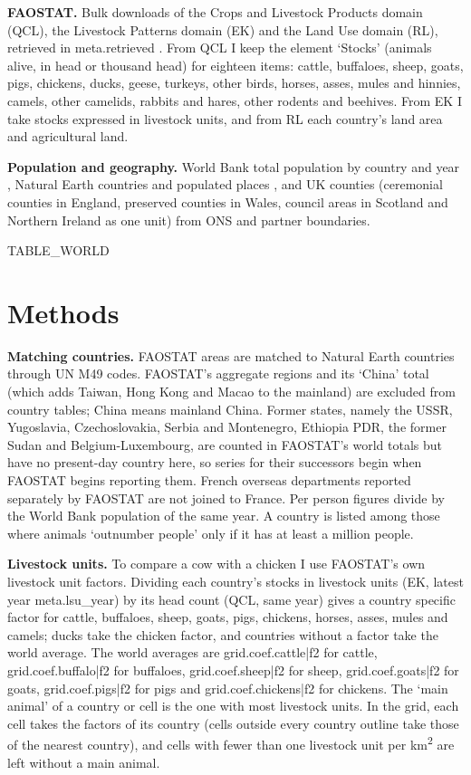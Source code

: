 \documentclass[11pt,a4paper]{article}
\begin{document}
\textbf{FAOSTAT.} Bulk downloads of the Crops and Livestock Products domain (QCL), the Livestock Patterns domain (EK) and the Land Use domain (RL), retrieved in {{meta.retrieved}} \citep{faostat}. From QCL I keep the element `Stocks' (animals alive, in head or thousand head) for eighteen items: cattle, buffaloes, sheep, goats, pigs, chickens, ducks, geese, turkeys, other birds, horses, asses, mules and hinnies, camels, other camelids, rabbits and hares, other rodents and beehives. From EK I take stocks expressed in livestock units, and from RL each country's land area and agricultural land.

\textbf{Population and geography.} World Bank total population by country and year \citep{wbpop}, Natural Earth countries and populated places \citep{naturalearth}, and UK counties (ceremonial counties in England, preserved counties in Wales, council areas in Scotland and Northern Ireland as one unit) from ONS and partner boundaries.

{{TABLE_WORLD}}

\section{Methods}
\textbf{Matching countries.} FAOSTAT areas are matched to Natural Earth countries through UN M49 codes. FAOSTAT's aggregate regions and its `China' total (which adds Taiwan, Hong Kong and Macao to the mainland) are excluded from country tables; China means mainland China. Former states, namely the USSR, Yugoslavia, Czechoslovakia, Serbia and Montenegro, Ethiopia PDR, the former Sudan and Belgium-Luxembourg, are counted in FAOSTAT's world totals but have no present-day country here, so series for their successors begin when FAOSTAT begins reporting them. French overseas departments reported separately by FAOSTAT are not joined to France. Per person figures divide by the World Bank population of the same year. A country is listed among those where animals `outnumber people' only if it has at least a million people.

\textbf{Livestock units.} To compare a cow with a chicken I use FAOSTAT's own livestock unit factors. Dividing each country's stocks in livestock units (EK, latest year {{meta.lsu_year}}) by its head count (QCL, same year) gives a country specific factor for cattle, buffaloes, sheep, goats, pigs, chickens, horses, asses, mules and camels; ducks take the chicken factor, and countries without a factor take the world average. The world averages are {{grid.coef.cattle|f2}} for cattle, {{grid.coef.buffalo|f2}} for buffaloes, {{grid.coef.sheep|f2}} for sheep, {{grid.coef.goats|f2}} for goats, {{grid.coef.pigs|f2}} for pigs and {{grid.coef.chickens|f2}} for chickens. The `main animal' of a country or cell is the one with most livestock units. In the grid, each cell takes the factors of its country (cells outside every country outline take those of the nearest country), and cells with fewer than one livestock unit per km\textsuperscript{2} are left without a main animal.
\end{document}
